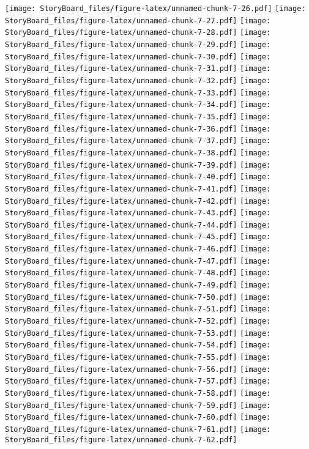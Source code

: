 \documentclass[
]{article}
\begin{document}
\texttt{[image: StoryBoard\_files/figure-latex/unnamed-chunk-7-26.pdf]}
\texttt{[image: StoryBoard\_files/figure-latex/unnamed-chunk-7-27.pdf]}
\texttt{[image: StoryBoard\_files/figure-latex/unnamed-chunk-7-28.pdf]}
\texttt{[image: StoryBoard\_files/figure-latex/unnamed-chunk-7-29.pdf]}
\texttt{[image: StoryBoard\_files/figure-latex/unnamed-chunk-7-30.pdf]}
\texttt{[image: StoryBoard\_files/figure-latex/unnamed-chunk-7-31.pdf]}
\texttt{[image: StoryBoard\_files/figure-latex/unnamed-chunk-7-32.pdf]}
\texttt{[image: StoryBoard\_files/figure-latex/unnamed-chunk-7-33.pdf]}
\texttt{[image: StoryBoard\_files/figure-latex/unnamed-chunk-7-34.pdf]}
\texttt{[image: StoryBoard\_files/figure-latex/unnamed-chunk-7-35.pdf]}
\texttt{[image: StoryBoard\_files/figure-latex/unnamed-chunk-7-36.pdf]}
\texttt{[image: StoryBoard\_files/figure-latex/unnamed-chunk-7-37.pdf]}
\texttt{[image: StoryBoard\_files/figure-latex/unnamed-chunk-7-38.pdf]}
\texttt{[image: StoryBoard\_files/figure-latex/unnamed-chunk-7-39.pdf]}
\texttt{[image: StoryBoard\_files/figure-latex/unnamed-chunk-7-40.pdf]}
\texttt{[image: StoryBoard\_files/figure-latex/unnamed-chunk-7-41.pdf]}
\texttt{[image: StoryBoard\_files/figure-latex/unnamed-chunk-7-42.pdf]}
\texttt{[image: StoryBoard\_files/figure-latex/unnamed-chunk-7-43.pdf]}
\texttt{[image: StoryBoard\_files/figure-latex/unnamed-chunk-7-44.pdf]}
\texttt{[image: StoryBoard\_files/figure-latex/unnamed-chunk-7-45.pdf]}
\texttt{[image: StoryBoard\_files/figure-latex/unnamed-chunk-7-46.pdf]}
\texttt{[image: StoryBoard\_files/figure-latex/unnamed-chunk-7-47.pdf]}
\texttt{[image: StoryBoard\_files/figure-latex/unnamed-chunk-7-48.pdf]}
\texttt{[image: StoryBoard\_files/figure-latex/unnamed-chunk-7-49.pdf]}
\texttt{[image: StoryBoard\_files/figure-latex/unnamed-chunk-7-50.pdf]}
\texttt{[image: StoryBoard\_files/figure-latex/unnamed-chunk-7-51.pdf]}
\texttt{[image: StoryBoard\_files/figure-latex/unnamed-chunk-7-52.pdf]}
\texttt{[image: StoryBoard\_files/figure-latex/unnamed-chunk-7-53.pdf]}
\texttt{[image: StoryBoard\_files/figure-latex/unnamed-chunk-7-54.pdf]}
\texttt{[image: StoryBoard\_files/figure-latex/unnamed-chunk-7-55.pdf]}
\texttt{[image: StoryBoard\_files/figure-latex/unnamed-chunk-7-56.pdf]}
\texttt{[image: StoryBoard\_files/figure-latex/unnamed-chunk-7-57.pdf]}
\texttt{[image: StoryBoard\_files/figure-latex/unnamed-chunk-7-58.pdf]}
\texttt{[image: StoryBoard\_files/figure-latex/unnamed-chunk-7-59.pdf]}
\texttt{[image: StoryBoard\_files/figure-latex/unnamed-chunk-7-60.pdf]}
\texttt{[image: StoryBoard\_files/figure-latex/unnamed-chunk-7-61.pdf]}
\texttt{[image: StoryBoard\_files/figure-latex/unnamed-chunk-7-62.pdf]}
\end{document}
